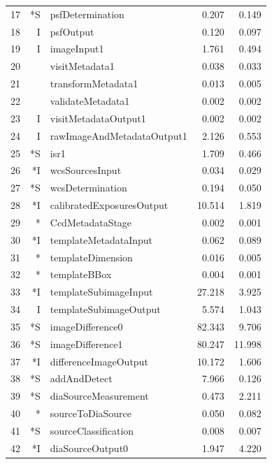 \begin{table}[p]
\begin{center}
\begin{tabular}{lrlrr}
17 & *S &              psfDetermination &  0.207 &  0.149 \\
18 &  I &                     psfOutput &  0.120 &  0.097 \\
19 &  I &                   imageInput1 &  1.761 &  0.494 \\
20 &    &                visitMetadata1 &  0.038 &  0.033 \\
21 &    &            transformMetadata1 &  0.013 &  0.005 \\
22 &    &             validateMetadata1 &  0.002 &  0.002 \\
23 &  I &          visitMetadataOutput1 &  0.002 &  0.002 \\
24 &  I &    rawImageAndMetadataOutput1 &  2.126 &  0.553 \\
25 & *S &                          isr1 &  1.709 &  0.466 \\
26 & *I &               wcsSourcesInput &  0.034 &  0.029 \\
27 & *S &              wcsDetermination &  0.194 &  0.050 \\
28 & *I &     calibratedExposuresOutput & 10.514 &  1.819 \\
29 & *\phantom{I}  &              CcdMetadataStage &  0.002 &  0.001 \\
30 & *I &         templateMetadataInput &  0.062 &  0.089 \\
31 & *\phantom{I}  &             templateDimension &  0.016 &  0.005 \\
32 & *\phantom{I}  &                  templateBBox &  0.004 &  0.001 \\
33 & *I &         templateSubimageInput & 27.218 &  3.925 \\
34 &  I &        templateSubimageOutput &  5.574 &  1.043 \\
35 & *S &              imageDifference0 & 82.343 &  9.706 \\
36 & *S &              imageDifference1 & 80.247 & 11.998 \\
37 & *I &         differenceImageOutput & 10.172 &  1.606 \\
38 & *S &                  addAndDetect &  7.966 &  0.126 \\
39 & *S &          diaSourceMeasurement &  0.473 &  2.211 \\
40 & *\phantom{I}  &             sourceToDiaSource &  0.050 &  0.082 \\
41 & *S &          sourceClassification &  0.008 &  0.007 \\
42 & *I &              diaSourceOutput0 &  1.947 &  4.220 \\

\end{tabular}
\end{center}
\end{table}
